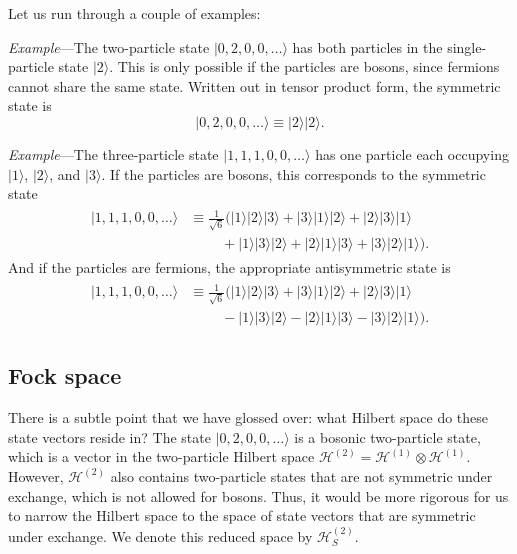 \documentclass[pra,12pt]{revtex4}
\begin{document}
Let us run through a couple of examples:

\begin{framed}
\noindent
\textit{Example}---The two-particle state $|0,2,0,0,\dots\rangle$ has
both particles in the single-particle state $|2\rangle$.  This is only
possible if the particles are bosons, since fermions cannot share the
same state.  Written out in tensor product form, the symmetric state
is
\begin{equation}
  |0,2,0,0,\dots\rangle \equiv |2\rangle|2\rangle.
\end{equation}
\end{framed}

\begin{framed}
\noindent
\textit{Example}---The three-particle state $|1,1,1,0,0,\dots\rangle$
has one particle each occupying $|1\rangle$, $|2\rangle$, and
$|3\rangle$.  If the particles are bosons, this corresponds to the
symmetric state
\begin{align}
  \begin{aligned}|1,1,1,0,0,\dots\rangle &\equiv \frac{1}{\sqrt{6}}\Big(|1\rangle|2\rangle|3\rangle + |3\rangle|1\rangle|2\rangle + |2\rangle|3\rangle|1\rangle \\&\;\qquad+ |1\rangle|3\rangle|2\rangle + |2\rangle|1\rangle|3\rangle + |3\rangle|2\rangle|1\rangle \Big).
  \end{aligned}
\end{align}
And if the particles are fermions, the appropriate antisymmetric state
is
\begin{align}
  \begin{aligned}|1,1,1,0,0,\dots\rangle &\equiv \frac{1}{\sqrt{6}} \Big(|1\rangle|2\rangle|3\rangle + |3\rangle|1\rangle|2\rangle + |2\rangle|3\rangle|1\rangle \\&\;\qquad - |1\rangle|3\rangle|2\rangle - |2\rangle|1\rangle|3\rangle - |3\rangle|2\rangle|1\rangle\Big).
  \end{aligned}
\end{align}
\end{framed}

\subsection{Fock space}

There is a subtle point that we have glossed over: what Hilbert space
do these state vectors reside in?  The state $|0,2,0,0,\dots\rangle$
is a bosonic two-particle state, which is a vector in the two-particle
Hilbert space $\mathscr{H}^{(2)} = \mathscr{H}^{(1)}\otimes
\mathscr{H}^{(1)}$.  However, $\mathscr{H}^{(2)}$ also contains
two-particle states that are not symmetric under exchange, which is
not allowed for bosons.  Thus, it would be more rigorous for us to
narrow the Hilbert space to the space of state vectors that are
symmetric under exchange.  We denote this reduced space by
$\mathscr{H}^{(2)}_S$.
\end{document}
